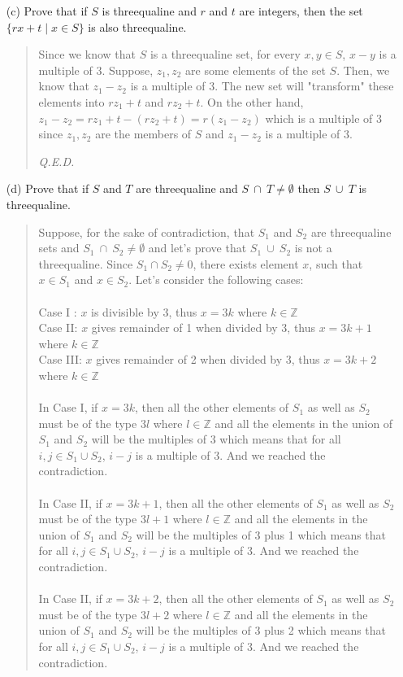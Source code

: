 \documentclass[12pt, a4paper]{article}                      %
\begin{document}
\begin{itemize}
\begin{itemize}
\item[(c)]
Prove that if $S$ is threequaline and $r$ and $t$ are integers, then the set $\{rx + t \mid x \in S\}$ is also threequaline.
\begin{quote}
Since we know that $S$ is a threequaline set, for every $x, y \in S$, $x - y$ is a multiple of 3. Suppose, $z_1, z_2$ are some elements of the set $S$. Then, we know that $z_1 - z_2$ is a multiple of 3. The new set will "transform" these elements into $rz_1 + t$ and $rz_2 + t$. On the other hand, $z_1 - z_2 = rz_1 + t - (rz_2 + t) = r(z_1 - z_2)$ which is a multiple of 3 since $z_1, z_2$ are the members of $S$ and $z_1 - z_2$ is a multiple of 3.
\begin{flushright}
\textit{Q.E.D.}
\end{flushright}
\end{quote}

\item[]

\item[(d)]
Prove that if $S$ and $T$ are threequaline and $S \ \cap \ T \neq \emptyset$ then $S \ \cup \ T$ is threequaline.
\begin{quote}
Suppose, for the sake of contradiction, that $S_1$ and $S_2$ are threequaline sets and $S_1 \ \cap \ S_2 \neq \emptyset$ and let's prove that
$S_1 \ \cup \ S_2$ is not a threequaline. Since $S_1 \cap S_2 \neq 0$, there exists element $x$, such that $x \in S_1$ and $x \in S_2$.
Let's consider the following cases:\\\\
Case I : $x$ is divisible by 3, thus $x = 3k$ where $k \in \mathbb{Z}$\\
Case II: $x$ gives remainder of 1 when divided by 3, thus $x = 3k + 1$ where $k \in \mathbb{Z}$\\
Case III: $x$ gives remainder of 2 when divided by 3, thus $x = 3k + 2$ where $k \in \mathbb{Z}$\\\\
In Case I, if $x = 3k$, then all the other elements of $S_1$ as well as $S_2$ must be of the type $3l$ where $l \in \mathbb{Z}$
and all the elements in the union of $S_1$ and $S_2$ will be the multiples of 3 which means that for all $i, j \in S_1 \cup S_2$,
$i - j$ is a multiple of 3. And we reached the contradiction.\\\\
In Case II, if $x = 3k + 1$, then all the other elements of $S_1$ as well as $S_2$ must be of the type $3l + 1$ where $l \in \mathbb{Z}$
and all the elements in the union of $S_1$ and $S_2$ will be the multiples of 3 plus 1 which means that for all $i, j \in S_1 \cup S_2$,
$i - j$ is a multiple of 3. And we reached the contradiction.\\\\
In Case II, if $x = 3k + 2$, then all the other elements of $S_1$ as well as $S_2$ must be of the type $3l + 2$ where $l \in \mathbb{Z}$
and all the elements in the union of $S_1$ and $S_2$ will be the multiples of 3 plus 2 which means that for all $i, j \in S_1 \cup S_2$,
$i - j$ is a multiple of 3. And we reached the contradiction.
\end{quote}
\end{itemize}


\end{itemize}
\end{document}
